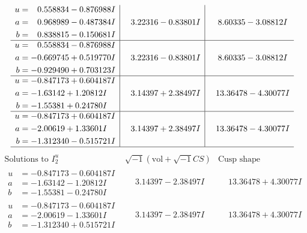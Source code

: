 \documentclass[1p]{elsarticle_modified}
\theoremstyle{definition}
\newcommand{\I}{\sqrt{-1}}
\begin{document}
$$\begin{array}{c|c|c}
\begin{aligned}
u &= \phantom{-}0.558834 - 0.876988 I \\
a &= \phantom{-}0.968989 - 0.487384 I \\
b &= \phantom{-}0.838815 - 0.150681 I\end{aligned}
 & \phantom{-}3.22316 - 0.83801 I & \phantom{-}8.60335 - 3.08812 I \\ \hline\begin{aligned}
u &= \phantom{-}0.558834 - 0.876988 I \\
a &= -0.669745 + 0.519770 I \\
b &= -0.929490 + 0.703123 I\end{aligned}
 & \phantom{-}3.22316 - 0.83801 I & \phantom{-}8.60335 - 3.08812 I \\ \hline\begin{aligned}
u &= -0.847173 + 0.604187 I \\
a &= -1.63142 + 1.20812 I \\
b &= -1.55381 + 0.24780 I\end{aligned}
 & \phantom{-}3.14397 + 2.38497 I & \phantom{-}13.36478 - 4.30077 I \\ \hline\begin{aligned}
u &= -0.847173 + 0.604187 I \\
a &= -2.00619 + 1.33601 I \\
b &= -1.312340 - 0.515721 I\end{aligned}
 & \phantom{-}3.14397 + 2.38497 I & \phantom{-}13.36478 - 4.30077 I\\
 \hline 
 \end{array}$$\newpage$$\begin{array}{c|c|c}  
\text{Solutions to }I^u_{2}& \I (\text{vol} + \sqrt{-1}CS) & \text{Cusp shape}\\
 \hline 
\begin{aligned}
u &= -0.847173 - 0.604187 I \\
a &= -1.63142 - 1.20812 I \\
b &= -1.55381 - 0.24780 I\end{aligned}
 & \phantom{-}3.14397 - 2.38497 I & \phantom{-}13.36478 + 4.30077 I \\ \hline\begin{aligned}
u &= -0.847173 - 0.604187 I \\
a &= -2.00619 - 1.33601 I \\
b &= -1.312340 + 0.515721 I\end{aligned}
 & \phantom{-}3.14397 - 2.38497 I & \phantom{-}13.36478 + 4.30077 I \\ \hline\begin{aligned}

\end{aligned}
\end{array}$$
\end{document}
